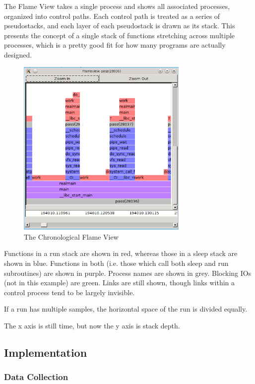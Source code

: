 \documentclass{article}
\begin{document}
The Flame View takes a single process and shows all associated processes, organized into control paths.  Each control path is treated as a series of pseudostacks, and each layer of each pseudostack is drawn as its stack.  This presents the concept of a single stack of functions stretching across multiple processes, which is a pretty good fit for how many programs are actually designed.

\begin{figure}[h]
\includegraphics[width=3.25in]{flameshot}
\caption{The Chronological Flame View}
\end{figure}

Functions in a run stack are shown in red, whereas those in a sleep stack are shown in blue.  Functions in both (i.e. those which call both sleep and run subroutines) are shown in purple. Process names are shown in grey.  Blocking IOs (not in this example) are green.  Links are still shown, though links within a control process tend to be largely invisible.

If a run has multiple samples, the horizontal space of the run is divided equally.

The x axis is still time, but now the y axis is stack depth.

\subsection{Implementation}
\subsubsection{Data Collection}

\end{document}
